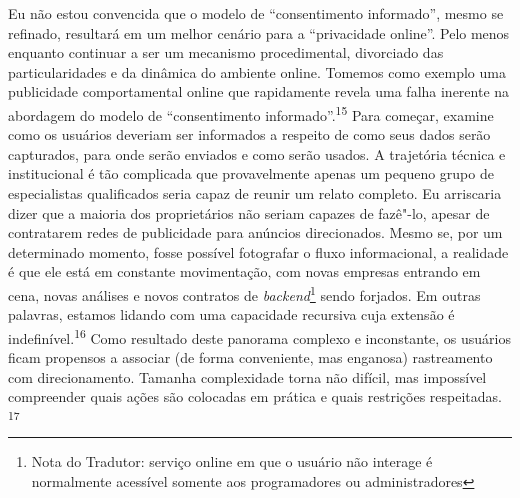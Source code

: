 Eu não estou convencida que o modelo de ``consentimento informado'',
mesmo se refinado, resultará em um melhor cenário para a ``privacidade
online''. Pelo menos enquanto continuar a ser um mecanismo
procedimental, divorciado das particularidades e da dinâmica do ambiente
online. Tomemos como exemplo uma publicidade comportamental online que
rapidamente revela uma falha inerente na abordagem do modelo de
``consentimento informado''.\textsuperscript{{15}} Para começar, examine
como os usuários deveriam ser informados a respeito de como seus dados
serão capturados, para onde serão enviados e como serão usados. A
trajetória técnica e institucional é tão complicada que provavelmente
apenas um pequeno grupo de especialistas qualificados seria capaz de
reunir um relato completo. Eu arriscaria dizer que a maioria dos
proprietários não seriam capazes de fazê"-lo, apesar de contratarem redes
de publicidade para anúncios direcionados. Mesmo se, por um determinado
momento, fosse possível fotografar o fluxo informacional, a realidade é
que ele está em constante movimentação, com novas empresas entrando em
cena, novas análises e novos contratos de \emph{backend}\footnote{Nota
  do Tradutor: serviço online em que o usuário não interage é
  normalmente acessível somente aos programadores ou administradores}
sendo forjados. Em outras palavras, estamos lidando com uma capacidade
recursiva cuja extensão é indefinível.\textsuperscript{{16}} Como
resultado deste panorama complexo e inconstante, os usuários ficam
propensos a associar (de forma conveniente, mas enganosa) rastreamento
com direcionamento. Tamanha complexidade torna não difícil, mas
impossível compreender quais ações são colocadas em prática e quais
restrições respeitadas. \textsuperscript{{17}}


